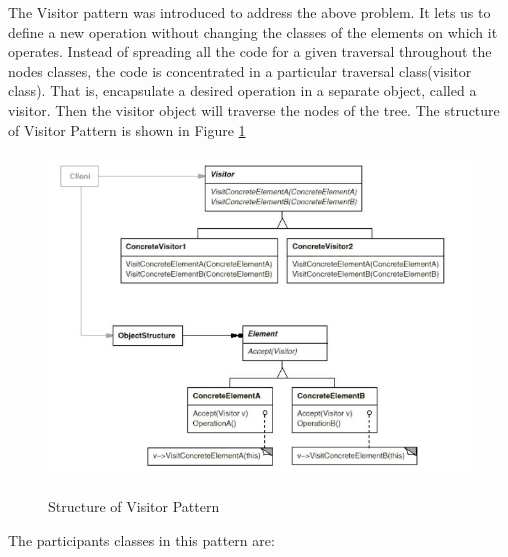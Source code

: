  
 The Visitor pattern\cite{ood} was introduced to address the above problem. It lets us to define a new operation without changing the classes of the elements on which it operates.
  Instead of spreading all the code for a given traversal throughout the nodes classes, the code is concentrated in a particular traversal class(visitor class).  That is, encapsulate a desired operation in a separate object, called a visitor. Then the visitor object will traverse the nodes of the tree. The structure of Visitor Pattern is shown in Figure \ref{Fig:4}
  \begin{figure}[H]
  	
  	
  	\centering
  	\includegraphics[width=.6\linewidth]{Figures/vstr}
  	\caption{Structure of Visitor Pattern}
  	\label{Fig:4}\cite{ood} 
  	
  \end{figure}
  The participants classes in this pattern are:
